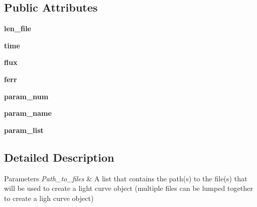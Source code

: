 \subsection*{Public Attributes}
\begin{DoxyCompactItemize}
\item 
\mbox{\label{classexospec_1_1lc__class_1_1_light_curve_data_adec28cf813c15d7c75f402d7bb51804d}} 
{\bfseries len\+\_\+file}
\item 
\mbox{\label{classexospec_1_1lc__class_1_1_light_curve_data_a118772717cee974c8f56534c1c4fa9bd}} 
{\bfseries time}
\item 
\mbox{\label{classexospec_1_1lc__class_1_1_light_curve_data_a8f871e916a7b560139181bf8cb9d0784}} 
{\bfseries flux}
\item 
\mbox{\label{classexospec_1_1lc__class_1_1_light_curve_data_adcc1b218150a87e12fd77a65103f4322}} 
{\bfseries ferr}
\item 
\mbox{\label{classexospec_1_1lc__class_1_1_light_curve_data_a0e0ef1bb47bea5bf61b47493a49eb2c1}} 
{\bfseries param\+\_\+num}
\item 
\mbox{\label{classexospec_1_1lc__class_1_1_light_curve_data_a2b6db36191285094a8456aba0f339b4a}} 
{\bfseries param\+\_\+name}
\item 
\mbox{\label{classexospec_1_1lc__class_1_1_light_curve_data_a0d1f6258313a1e9ceb9bbe8ddf59eb76}} 
{\bfseries param\+\_\+list}
\end{DoxyCompactItemize}


\subsection{Detailed Description}

\begin{DoxyParams}{Parameters}
{\em Path\+\_\+to\+\_\+files} & A list that contains the path(s) to the file(s) that will be used to create a light curve object (multiple files can be lumped together to create a ligh curve object) \\
\hline
\end{DoxyParams}


